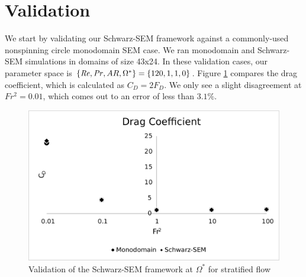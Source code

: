 \section{Validation}
\label{section:validation}
We start by validating our Schwarz-SEM framework against a commonly-used nonspinning circle monodomain SEM case. We ran monodomain and Schwarz-SEM simulations in domains of size 43x24. In these validation cases, our parameter space is $\{\mathit{Re}, \mathit{Pr}, AR, \Omega^{\ast}\} = \{120, 1, 1, 0\}$. Figure \ref{fig:nn val} compares the drag coefficient, which is calculated as $C_D = 2F_D$. We only see a slight disagreement at $Fr^2 = 0.01$, which comes out to an error of less than $3.1\%$.  

\begin{figure}
    \centerline{\includegraphics[width=.8\textwidth]{images/dragvalnn.eps}}
    \caption{Validation of the Schwarz-SEM framework at $\Omega^{\ast}$ for stratified flow}
    \label{fig:nn val}
\end{figure}

